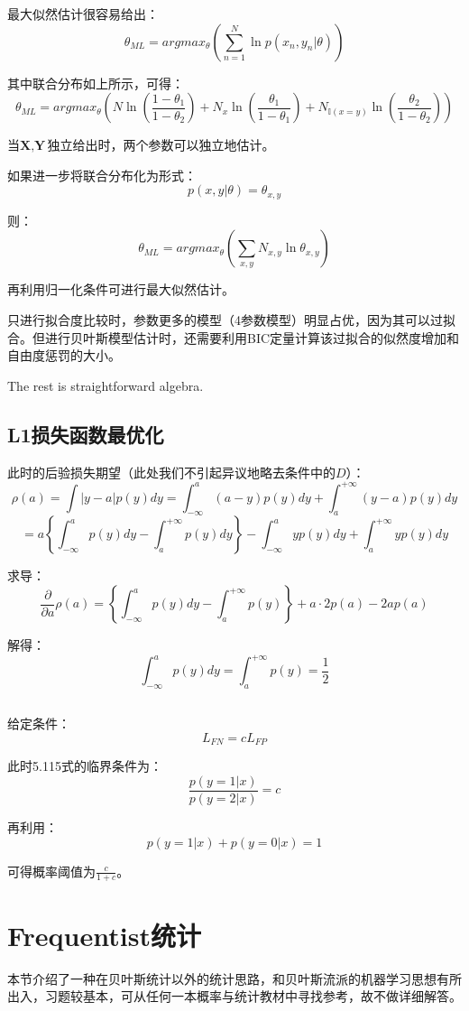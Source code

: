 \documentclass[UTF8]{ctexart}
\begin{document}
最大似然估计很容易给出：
$$\theta_{ML}=argmax_{\theta}(\sum_{n=1}^{N}\ln p(x_{n},y_{n}|\theta))$$

其中联合分布如上所示，可得：
$$\theta_{ML}=argmax_{\theta}(N\ln(\frac{1-\theta_{1}}{1-\theta_{2}})+N_{x}\ln(\frac{\theta_{1}}{1-\theta_{1}}) + N_{\mathbb{I}(x=y)}\ln(\frac{\theta_{2}}{1-\theta_{2}}))$$

当$\textbf{X},\textbf{Y}$独立给出时，两个参数可以独立地估计。

如果进一步将联合分布化为形式：
$$p(x,y|\theta)=\theta_{x,y}$$

则：
$$\theta_{ML}=argmax_{\theta}(\sum_{x,y}N_{x,y}\ln \theta_{x,y})$$

再利用归一化条件可进行最大似然估计。

只进行拟合度比较时，参数更多的模型（4参数模型）明显占优，因为其可以过拟合。但进行贝叶斯模型估计时，还需要利用BIC定量计算该过拟合的似然度增加和自由度惩罚的大小。

The rest is straightforward algebra.

\subsection{L1损失函数最优化}
此时的后验损失期望（此处我们不引起异议地略去条件中的$D$）：
$$\rho(a) = \int |y-a|p(y)dy = \int_{-\infty}^{a}(a-y)p(y)dy + \int_{a}^{+\infty}(y-a)p(y)dy$$
$$=a\left\{\int_{-\infty}^{a}p(y)dy - \int_{a}^{+\infty}p(y)dy  \right\} -\int_{-\infty}^{a}yp(y)dy + \int_{a}^{+\infty}yp(y)dy$$

求导：
$$\frac{\partial}{\partial a}\rho(a) = \left\{\int_{-\infty}^{a}p(y)dy - \int_{a}^{+\infty}p(y)  \right\} + a\cdot 2p(a) - 2a p(a)$$

解得：
$$\int_{-\infty}^{a}p(y)dy = \int_{a}^{+\infty}p(y) = \frac{1}{2}$$


\subsection{}
给定条件：
$$L_{FN}=cL_{FP}$$

此时5.115式的临界条件为：
$$\frac{p(y=1|x)}{p(y=2|x)} = c$$

再利用：
$$p(y=1|x)+p(y=0|x)=1$$

可得概率阈值为$\frac{c}{1+c}$。

\newpage
\section{Frequentist统计}
本节介绍了一种在贝叶斯统计以外的统计思路，和贝叶斯流派的机器学习思想有所出入，习题较基本，可从任何一本概率与统计教材中寻找参考，故不做详细解答。
\end{document}
